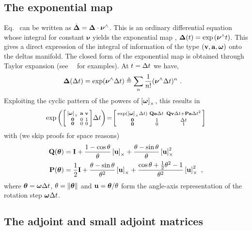 \subsection{The exponential map}

Eq.~ can be written as $\dot{{{\bm \Delta}}}={{\bm \Delta}}\cdot\bm\nu^\wedge$.
This is an ordinary differential equation whose  integral for constant $\bm\nu$ yields the exponential map \cite{sola2018micro}, $ {{\bm \Delta}}(t) = \exp\left(\bm\nu^\wedge t\right)$.
This gives a direct expression of the integral of information of the type $({\bf v},{\bf a},{{\bm \omega}})$ onto the deltas manifold. %
The closed form of the exponential map is obtained through Taylor expansion (see \eg\ \cite{sola2018micro}\ for examples). 
At $t=\Delta t$ we have,
%
\begin{align}
{{\bm \Delta}}(\Delta t) 
&= \exp(\bm\nu^\wedge\Delta t) \triangleq \sum_n \frac1{n!}(\bm\nu^\wedge\Delta t)^n
~.
\end{align}
%
%
Exploiting the cyclic pattern of the powers of $\left[{{\bm \omega}}\right]_\times$, this results in
%
\begin{align}
\exp\left(\begin{bsmallmatrix}
\left[{{\bm \omega}}\right]_\times & {\bf a} & {\bf v} \\
\bf0 & 0 & 1 \\
\bf0 & 0 & 0 
\end{bsmallmatrix}\Delta t\right) 
\!=\! \begin{bsmallmatrix}
\exp(\left[{{\bm \omega}}\right]_\times\Delta t) & {\bf Q}{\bf a}\Delta t\, & {\bf Q}{\bf v}\Delta t+{\bf P}{\bf a}\Delta t^2 \\
\bf0 & 1 & \Delta t \\
\bf0 & 0 & 1
\end{bsmallmatrix}
\end{align}
%
with (we skip proofs for space reasons)
%
\begin{align} \label{eq:RQP}
{\bf Q} ({{\bm \theta}})
 &= 
  {\bf I} + \frac{1-\cos\theta}{\theta}\left[{\bf u}\right]_\times + \frac{\theta-\sin\theta}{\theta}\left[{\bf u}\right]_\times^2\\
{\bf P} ({{\bm \theta}})
 &= 
  \frac12{\bf I} 
   + \frac{\theta-\sin\theta}{\theta^2}\left[{\bf u}\right]_\times 
   + \frac{\cos\theta + \frac12\theta^2 - 1}{\theta^2}\left[{\bf u}\right]_\times^2
~,
\end{align}
%
where  ${{\bm \theta}}={{\bm \omega}}\Delta t$, $\theta={\left\|{{\bm \theta}}\right\|}$ and ${\bf u}={{\bm \theta}}/\theta$ form the angle-axis representation of the rotation step ${{\bm \omega}}\Delta t$. 


\subsection{The adjoint and small adjoint matrices}
\label{sec:imu_compact_adjoint}

